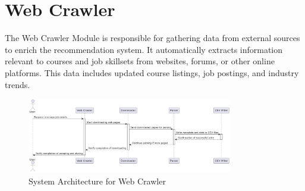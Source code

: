 \section{Web Crawler}

The Web Crawler Module is responsible for gathering data from external sources to enrich the recommendation system. It automatically extracts information relevant to courses and job skillsets from websites, forums, or other online platforms. This data includes updated course listings, job postings, and industry trends.\\

\begin{figure}[t]
\centering
\includegraphics[width=0.8\textwidth]{3/webcrawler.png}
\caption{System Architecture for Web Crawler}
\label{fig:web_crawler}
\end{figure}
